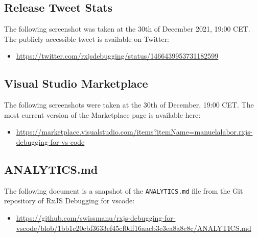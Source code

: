 








\subsection{Release Tweet Stats \label{sec:release-tweet-stats}}
The following screenshot was taken at the 30th of December 2021, 19:00 CET. The publicly accessible tweet is available on Twitter:

\begin{itemize}
  \item \url{https://twitter.com/rxjsdebugging/status/1466439953731182599}
\end{itemize}










\subsection{Visual Studio Marketplace \label{sec:marketplace}}
The following screenshots were taken at the 30th of December, 19:00 CET. The most current version of the Marketplace page is available here:

\begin{itemize}
  \item \url{https://marketplace.visualstudio.com/items?itemName=manuelalabor.rxjs-debugging-for-vs-code}
\end{itemize}









\subsection{ANALYTICS.md \label{sec:analytics}}
The following document is a snapshot of the \texttt{ANALYTICS.md} file from the Git repository of RxJS Debugging for vscode:

\begin{itemize}
  \item \url{https://github.com/swissmanu/rxjs-debugging-for-vscode/blob/1bb1c20cbf3633ef45cf0df16aacb3c3ea8a8c8c/ANALYTICS.md}
\end{itemize}

